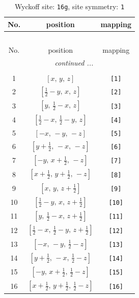 \documentclass[fleqn,8pt]{jsarticle}
\begin{document}
\begin{longtable}{ccc}
\caption{Wyckoff site: {\tt 16g}, site symmetry: {\tt 1}}
 \\
 \hline \hline
No. & position & mapping \\ \hline \endfirsthead

\multicolumn{2}{l}{\tablename\ \thetable{}} \\
 \hline \hline
No. & position & mapping \\ \hline \endhead

 \hline \hline
\multicolumn{2}{r}{\footnotesize\it continued ...} \\ \endfoot

 \hline \hline
\multicolumn{2}{r}{} \\ \endlastfoot

1 & $\left[ x,\, y,\, z \right]$ & {\tt [1]} \\ \hline
2 & $\left[ \frac{1}{2} - y,\, x,\, z \right]$ & {\tt [2]} \\ \hline
3 & $\left[ y,\, \frac{1}{2} - x,\, z \right]$ & {\tt [3]} \\ \hline
4 & $\left[ \frac{1}{2} - x,\, \frac{1}{2} - y,\, z \right]$ & {\tt [4]} \\ \hline
5 & $\left[ - x,\, - y,\, - z \right]$ & {\tt [5]} \\ \hline
6 & $\left[ y + \frac{1}{2},\, - x,\, - z \right]$ & {\tt [6]} \\ \hline
7 & $\left[ - y,\, x + \frac{1}{2},\, - z \right]$ & {\tt [7]} \\ \hline
8 & $\left[ x + \frac{1}{2},\, y + \frac{1}{2},\, - z \right]$ & {\tt [8]} \\ \hline
9 & $\left[ x,\, y,\, z + \frac{1}{2} \right]$ & {\tt [9]} \\ \hline
10 & $\left[ \frac{1}{2} - y,\, x,\, z + \frac{1}{2} \right]$ & {\tt [10]} \\ \hline
11 & $\left[ y,\, \frac{1}{2} - x,\, z + \frac{1}{2} \right]$ & {\tt [11]} \\ \hline
12 & $\left[ \frac{1}{2} - x,\, \frac{1}{2} - y,\, z + \frac{1}{2} \right]$ & {\tt [12]} \\ \hline
13 & $\left[ - x,\, - y,\, \frac{1}{2} - z \right]$ & {\tt [13]} \\ \hline
14 & $\left[ y + \frac{1}{2},\, - x,\, \frac{1}{2} - z \right]$ & {\tt [14]} \\ \hline
15 & $\left[ - y,\, x + \frac{1}{2},\, \frac{1}{2} - z \right]$ & {\tt [15]} \\ \hline
16 & $\left[ x + \frac{1}{2},\, y + \frac{1}{2},\, \frac{1}{2} - z \right]$ & {\tt [16]} \\
\end{longtable}
\end{document}

